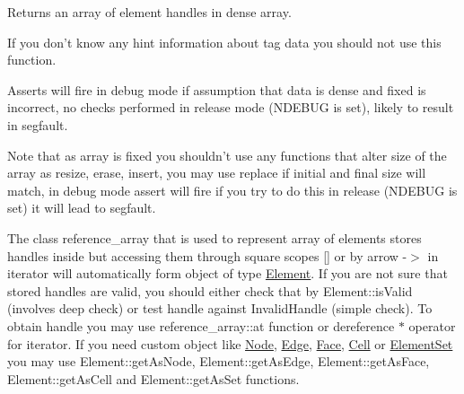 Returns an array of element handles in dense array. 

If you don't know any hint information about tag data you should not use this function.

Asserts will fire in debug mode if assumption that data is dense and fixed is incorrect, no checks performed in release mode (N\-D\-E\-B\-U\-G is set), likely to result in segfault.

Note that as array is fixed you shouldn't use any functions that alter size of the array as resize, erase, insert, you may use replace if initial and final size will match, in debug mode assert will fire if you try to do this in release (N\-D\-E\-B\-U\-G is set) it will lead to segfault.

The class reference\-\_\-array that is used to represent array of elements stores handles inside but accessing them through square scopes \mbox{[}\mbox{]} or by arrow -\/$>$ in iterator will automatically form object of type \hyperlink{classINMOST_1_1Element}{Element}. If you are not sure that stored handles are valid, you should either check that by Element\-::is\-Valid (involves deep check) or test handle against Invalid\-Handle (simple check). To obtain handle you may use reference\-\_\-array\-::at function or dereference $\ast$ operator for iterator. If you need custom object like \hyperlink{classINMOST_1_1Node}{Node}, \hyperlink{classINMOST_1_1Edge}{Edge}, \hyperlink{classINMOST_1_1Face}{Face}, \hyperlink{classINMOST_1_1Cell}{Cell} or \hyperlink{classINMOST_1_1ElementSet}{Element\-Set} you may use Element\-::get\-As\-Node, Element\-::get\-As\-Edge, Element\-::get\-As\-Face, Element\-::get\-As\-Cell and Element\-::get\-As\-Set functions.


